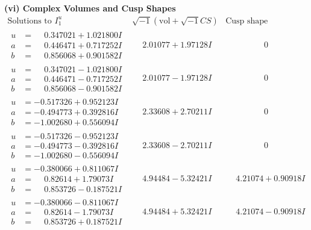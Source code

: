 \documentclass[1p]{elsarticle_modified}
\theoremstyle{definition}
\newcommand{\I}{\sqrt{-1}}
\begin{document}
\newpage\flushleft \textbf{(vi) Complex Volumes and Cusp Shapes}
$$\begin{array}{c|c|c}  
\text{Solutions to }I^u_{1}& \I (\text{vol} + \sqrt{-1}CS) & \text{Cusp shape}\\
 \hline 
\begin{aligned}
u &= \phantom{-}0.347021 + 1.021800 I \\
a &= \phantom{-}0.446471 + 0.717252 I \\
b &= \phantom{-}0.856068 + 0.901582 I\end{aligned}
 & \phantom{-}2.01077 + 1.97128 I & \phantom{-0.000000 } 0 \\ \hline\begin{aligned}
u &= \phantom{-}0.347021 - 1.021800 I \\
a &= \phantom{-}0.446471 - 0.717252 I \\
b &= \phantom{-}0.856068 - 0.901582 I\end{aligned}
 & \phantom{-}2.01077 - 1.97128 I & \phantom{-0.000000 } 0 \\ \hline\begin{aligned}
u &= -0.517326 + 0.952123 I \\
a &= -0.494773 + 0.392816 I \\
b &= -1.002680 + 0.556094 I\end{aligned}
 & \phantom{-}2.33608 + 2.70211 I & \phantom{-0.000000 } 0 \\ \hline\begin{aligned}
u &= -0.517326 - 0.952123 I \\
a &= -0.494773 - 0.392816 I \\
b &= -1.002680 - 0.556094 I\end{aligned}
 & \phantom{-}2.33608 - 2.70211 I & \phantom{-0.000000 } 0 \\ \hline\begin{aligned}
u &= -0.380066 + 0.811067 I \\
a &= \phantom{-}0.82614 + 1.79073 I \\
b &= \phantom{-}0.853726 - 0.187521 I\end{aligned}
 & \phantom{-}4.94484 - 5.32421 I & \phantom{-}4.21074 + 0.90918 I \\ \hline\begin{aligned}
u &= -0.380066 - 0.811067 I \\
a &= \phantom{-}0.82614 - 1.79073 I \\
b &= \phantom{-}0.853726 + 0.187521 I\end{aligned}
 & \phantom{-}4.94484 + 5.32421 I & \phantom{-}4.21074 - 0.90918 I \\ \hline\begin{aligned}

\end{aligned}
\end{array}$$
\end{document}

